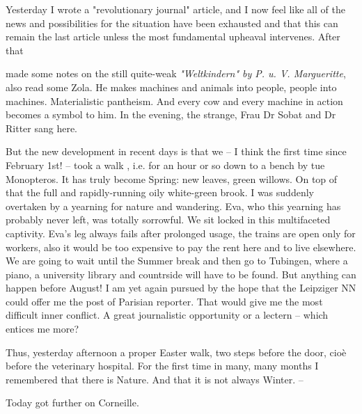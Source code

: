 
Yesterday I wrote a "revolutionary journal" article, and I now feel like all of the news and possibilities for the situation have been exhausted and that this can remain the last article unless the most fundamental upheaval intervenes. After that

 made some notes on the still quite-weak \textit{"Weltkindern" by P. u. V. Margueritte}, also read some Zola. He makes machines and animals into people, people into machines. Materialistic pantheism. And every  cow and every machine in action becomes a symbol to him. In the evening, the strange,  Frau Dr Sobat and Dr Ritter sang here. 
 
But the new development in recent days is that we -- I think the first time since February 1st! -- took a walk , i.e. for an hour or so down to a bench by tue Monopteros. It has truly become Spring: new leaves, green willows. On top of that the full and rapidly-running oily white-green brook. I was suddenly overtaken by a yearning for nature and wandering. Eva, who this yearning has probably never left, was totally sorrowful. We sit locked in this multifaceted captivity. Eva's leg always fails after prolonged usage, the trains are open only for workers, also it would be too expensive to pay the rent here and to live elsewhere. We are going to wait until the Summer break and then go to Tubingen, where a piano, a university library and countrside will have to be found. But anything can happen before August! I am yet again pursued by the hope that the Leipziger NN could offer me the post of Parisian reporter. That would give me the most difficult inner conflict. A great journalistic opportunity or a lectern -- which entices me more?

Thus, yesterday afternoon a proper Easter walk, two steps before the door, cioè before the veterinary hospital. For the first time in many, many months I remembered that there is Nature. And that it is not always Winter. --

Today got further on Corneille.

